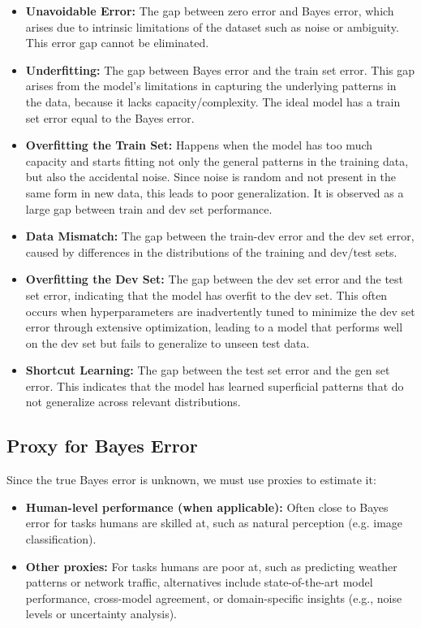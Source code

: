 \documentclass[12pt,openany]{book}
\begin{document}
\begin{itemize}
    \item \textbf{Unavoidable Error:} The gap between zero error and Bayes error, which arises due to intrinsic limitations of the dataset such as noise or ambiguity. This error gap cannot be eliminated.
    \item \textbf{Underfitting:} The gap between Bayes error and the train set error. This gap arises from the model's limitations in capturing the underlying patterns in the data, because it lacks capacity/complexity. The ideal model has a train set error equal to the Bayes error.
    \item \textbf{Overfitting the Train Set:} Happens when the model has too much capacity and starts fitting not only the general patterns in the training data, but also the accidental noise. Since noise is random and not present in the same form in new data, this leads to poor generalization. It is observed as a large gap between train and dev set performance.
    \item \textbf{Data Mismatch:} The gap between the train-dev error and the dev set error, caused by differences in the distributions of the training and dev/test sets.
    \item \textbf{Overfitting the Dev Set:} The gap between the dev set error and the test set error, indicating that the model has overfit to the dev set. This often occurs when hyperparameters are inadvertently tuned to minimize the dev set error through extensive optimization, leading to a model that performs well on the dev set but fails to generalize to unseen test data.
    \item \textbf{Shortcut Learning:} The gap between the test set error and the gen set error. This indicates that the model has learned superficial patterns that do not generalize across relevant distributions.
\end{itemize}


\subsection{Proxy for Bayes Error} \label{subsec:proxy-for-bayes-error}
Since the true Bayes error is unknown, we must use proxies to estimate it:
\begin{itemize}
    \item \textbf{Human-level performance (when applicable):} Often close to Bayes error for tasks humans are skilled at, such as natural perception (e.g. image classification).
    \item \textbf{Other proxies:} For tasks humans are poor at, such as predicting weather patterns or network traffic, alternatives include state-of-the-art model performance, cross-model agreement, or domain-specific insights (e.g., noise levels or uncertainty analysis). 
\end{itemize} 
\end{document}
